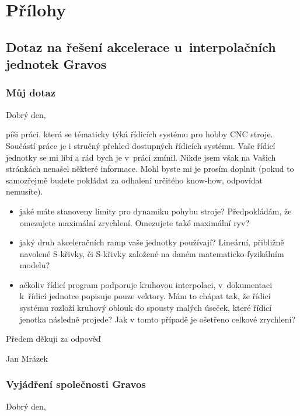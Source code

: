 \documentclass [a4paper,11pt,oneside,notitlepage,openright]{report} %
\begin{document}
\part{Přílohy}
\begin{appendix}
%	
\chapter{Dotaz na řešení akcelerace u~interpolačních jednotek Gravos}\label{kap:gravos}
\section{Můj dotaz}
Dobrý den,

píši práci, která se tématicky týká řídicích systému pro hobby CNC stroje.
Součástí práce je i stručný přehled dostupných řídicích systému. Vaše
řídicí jednotky se mi líbí a rád bych je v~práci zmínil. Nikde jsem však na
Vašich stránkách nenašel některé informace. Mohl byste mi je prosím doplnit
(pokud to samozřejmě budete pokládat za odhalení určitého know-how,
odpovídat nemusíte).
\begin{itemize}
\item jaké máte stanoveny limity pro dynamiku pohybu stroje? Předpokládám, že
omezujete maximální zrychlení. Omezujete také maximální ryv? 
\item jaký druh akceleračních ramp vaše jednotky používají? Lineární, přibližně
navolené S-křivky, či S-křivky založené na daném matematicko-fyzikálním
modelu?
\item ačkoliv řídicí program podporuje kruhovou interpolaci, v~dokumentaci k~řídicí jednotce popisuje pouze vektory. Mám to chápat tak, že řídicí
systému rozloží kruhový oblouk do spousty malých úseček, které řídicí
jenotka následně projede? Jak v tomto případě je ošetřeno celkové
zrychlení?
\end{itemize}

\hfill Předem děkuji za odpověď

\hfill Jan Mrázek

\section{Vyjádření společnosti Gravos}
Dobrý den,


\end{appendix}
\end{document}
